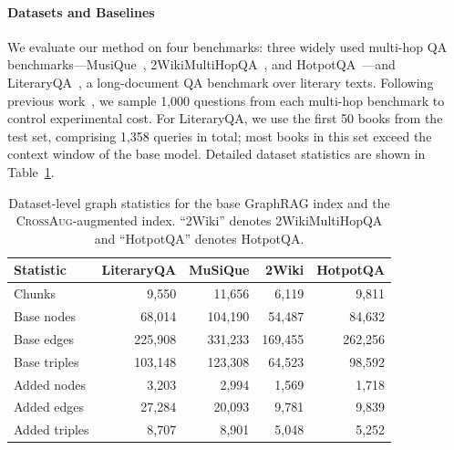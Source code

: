 \documentclass[11pt]{article}
\newcommand{\ours}{\textsc{CrossAug}\xspace}
\begin{document}
\paragraph{Datasets and Baselines}
We evaluate our method on four benchmarks: three widely used multi-hop QA benchmarks---MusiQue~\citep{trivedi2021musique}, 2WikiMultiHopQA~\citep{ho2020constructing}, and HotpotQA~\citep{yang2018hotpotqa}---and LiteraryQA~\citep{bonomo2025literaryqa}, a long-document QA benchmark over literary texts. Following previous work~\citep{gutierrez2024hipporag}, we sample 1,000 questions from each multi-hop benchmark to control experimental cost. For LiteraryQA, we use the first 50 books from the test set, comprising 1,358 queries in total; most books in this set exceed the context window of the base model. Detailed dataset statistics are shown in Table~\ref{tab:datasets}.
\begin{table}[!htbp]
\centering
\small
\setlength{\tabcolsep}{2pt}
\renewcommand{\arraystretch}{1.15}
\begin{tabular}{@{}lrrrr@{}}
\hline
\textbf{Statistic} & \textbf{LiteraryQA} & \textbf{MuSiQue} & \textbf{2Wiki} & \textbf{HotpotQA} \\
\hline
Chunks & 9,550 & 11,656 & 6,119 & 9,811 \\
Base nodes & 68,014 & 104,190 & 54,487 & 84,632 \\
Base edges & 225,908 & 331,233 & 169,455 & 262,256 \\
Base triples & 103,148 & 123,308 & 64,523 & 98,592 \\
Added nodes & 3,203 & 2,994 & 1,569 & 1,718 \\
Added edges & 27,284 & 20,093 & 9,781 & 9,839 \\
Added triples & 8,707 & 8,901 & 5,048 & 5,252 \\
\hline
\end{tabular}
\caption{Dataset-level graph statistics for the base GraphRAG index and the \ours-augmented index. ``2Wiki'' denotes 2WikiMultiHopQA and ``HotpotQA'' denotes HotpotQA.}
\label{tab:datasets}
\end{table}
\end{document}
